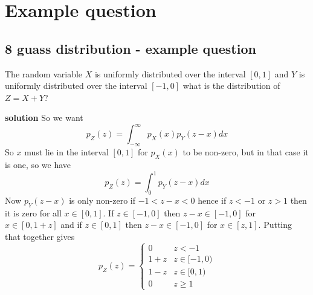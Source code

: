 
\ifind
\section*{Example question}
\else
\subsection*{8 guass distribution - example question}
\fi

The random variable $X$ is uniformly distributed over the interval $[0,1]$ and $Y$ is uniformly distributed over the interval $[-1,0]$ what is the distribution of $Z=X+Y$?


\noindent \textbf{solution} So we want
\begin{equation}
p_Z(z)=\int_{-\infty}^\infty p_X(x)p_Y(z-x)dx
\end{equation}
So $x$ must lie in the interval $[0,1]$ for $p_X(x)$ to be non-zero, but in that case it is one, so we have
\begin{equation}
p_Z(z)=\int_0^1 p_Y(z-x)dx
\end{equation}
Now $p_Y(z-x)$ is only non-zero if $-1<z-x<0$ hence if $z<-1$ or $z>1$
then it is zero for all $x\in [0,1]$. If $z\in[-1,0]$ then $z-x\in
[-1,0]$ for $x\in[0,1+z]$ and if $z\in [0,1]$ then $z-x\in[-1,0]$ for
$x\in [z,1]$. Putting that together gives
\begin{equation}
p_Z(z)=\left\{\begin{array}{cl}
0&z<-1\\
1+z&z\in[-1,0)\\
1-z&z\in[0,1)\\
0&z\ge 1
\end{array}
\right.
\end{equation}
